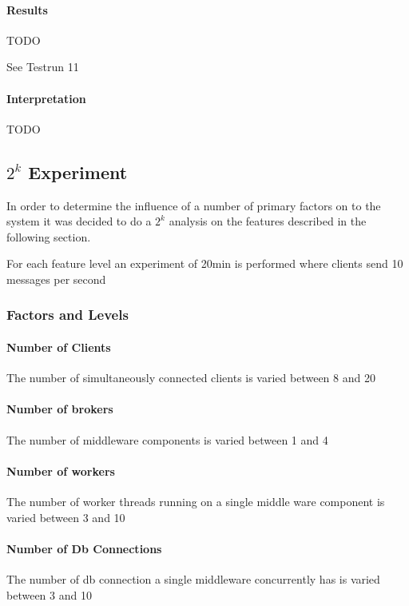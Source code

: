 \documentclass[milestone1.tex]{subfiles}
\begin{document}
\paragraph{Results}

TODO

See Testrun 11


\paragraph{Interpretation}

TODO

\subsection{$2^k$ Experiment}
In order to determine the influence of a number of primary factors on to the system it was decided to do a $2^k$ analysis on the features described in the following section.

For each feature level an experiment of 20min is performed where clients send 10 messages per second

\subsubsection{Factors and Levels}

\paragraph{Number of Clients}
The number of simultaneously connected clients is varied between 8 and 20

\paragraph{Number of brokers}

The number of middleware components is varied between 1 and 4
\paragraph{Number of workers}

The number of worker threads running on a single middle ware component is varied between 3 and 10

\paragraph{Number of Db Connections}

The number of db connection a single middleware concurrently has is varied between 3 and 10
\end{document}
